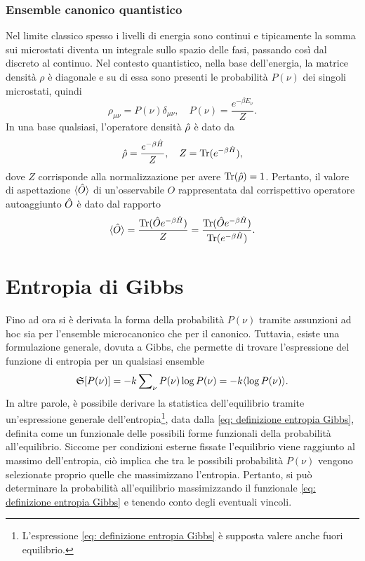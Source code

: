 \subsubsection{Ensemble canonico quantistico}
Nel limite classico spesso i livelli di energia sono continui e tipicamente la somma sui microstati diventa un integrale sullo spazio delle fasi, passando così dal discreto al continuo. Nel contesto quantistico, nella base dell'energia, la matrice densità $\rho$ è diagonale e su di essa sono presenti le probabilità $P(\nu)$ dei singoli microstati, quindi
\begin{equation}
    \rho_{\mu\nu} = P(\nu)\delta_{\mu\nu},\quad P(\nu) = \frac{e^{-\beta E_\nu}}{Z}.
\end{equation}
In una base qualsiasi, l'operatore densità $\hat{\rho}$ è dato da
\begin{equation}
    \hat{\rho} = \frac{e^{-\beta\hat{H}}}{Z},\quad Z = \mathrm{Tr}(e^{-\beta\hat{H}}),
\end{equation}
dove $Z$ corrisponde alla normalizzazione per avere $\mathrm{Tr}(\hat{\rho}) = 1$. Pertanto, il valore di aspettazione $\langle \hat{O} \rangle$ di un'osservabile $O$ rappresentata dal corrispettivo operatore autoaggiunto $\hat{O}$ è dato dal rapporto
\begin{equation}
    \langle \hat{O} \rangle = \frac{\mathrm{Tr}(\hat{O} e^{-\beta\hat{H}})}{Z} = \frac{\mathrm{Tr}(\hat{O} e^{-\beta\hat{H}})}{\mathrm{Tr}(e^{-\beta\hat{H}})}.
\end{equation}

\section{Entropia di Gibbs}
Fino ad ora si è derivata la forma della probabilità $P(\nu)$ tramite assunzioni ad hoc sia per l'ensemble microcanonico che per il canonico. Tuttavia, esiste una formulazione generale, dovuta a Gibbs, che permette di trovare l'espressione del funzione di entropia per un qualsiasi ensemble
\begin{equation}
\label{eq: definizione entropia Gibbs}
    \mathfrak{S}[P(\nu)] = -k\sum\nolimits_\nu P(\nu)\log{P(\nu)} = -k\langle \log{P(\nu)} \rangle.
\end{equation}
In altre parole, è possibile derivare la statistica dell'equilibrio tramite un'espressione generale dell'entropia\footnote{L'espressione \eqref{eq: definizione entropia Gibbs} è supposta valere anche fuori equilibrio.}, data dalla \eqref{eq: definizione entropia Gibbs}, definita come un funzionale delle possibili forme funzionali della probabilità all'equilibrio. Siccome per condizioni esterne fissate l'equilibrio viene raggiunto al massimo dell'entropia, ciò implica che tra le possibili probabilità $P(\nu)$ vengono selezionate proprio quelle che massimizzano l'entropia. Pertanto, si può determinare la probabilità all'equilibrio massimizzando il funzionale \eqref{eq: definizione entropia Gibbs} e tenendo conto degli eventuali vincoli.

